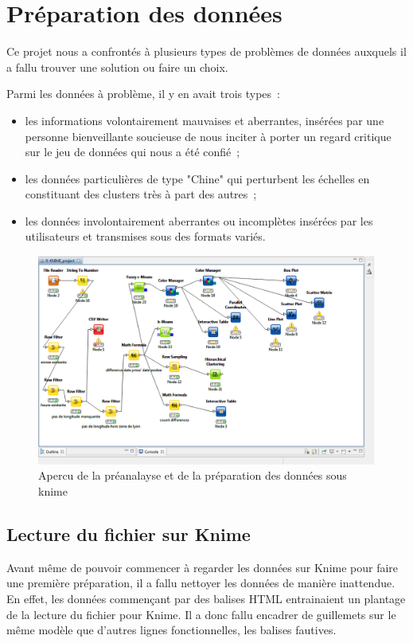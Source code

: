 \chapter{Préparation des données}

Ce projet nous a confrontés à plusieurs types de problèmes de données auxquels il a fallu trouver une solution ou faire un choix.

Parmi les données à problème, il y en avait trois types~:
\begin{itemize}
    \item les informations volontairement mauvaises et aberrantes, insérées par une personne bienveillante soucieuse de nous inciter à porter un regard critique sur le jeu de données qui nous a été confié~;
    \item les données particulières de type "Chine" qui perturbent les échelles en constituant des clusters très à part des autres~;
    \item les données involontairement aberrantes ou incomplètes insérées par les utilisateurs et transmises sous des formats variés.
\end{itemize}
\vspace{5mm}

\begin{figure}[!h]
    \centering
    \includegraphics[width=14cm]{images/captureKnime.png}
    \caption{Apercu de la préanalayse et de la préparation des données sous knime}
    \label{fig:knime}
\end{figure}

\section{Lecture du fichier sur Knime}
Avant même de pouvoir commencer à regarder les données sur Knime pour faire une première préparation, il a fallu nettoyer les données de manière inattendue. En effet, les données commençant par des balises HTML entrainaient un plantage de la lecture du fichier pour Knime. Il a donc fallu encadrer de guillemets sur le même modèle que d'autres lignes fonctionnelles, les balises fautives.

